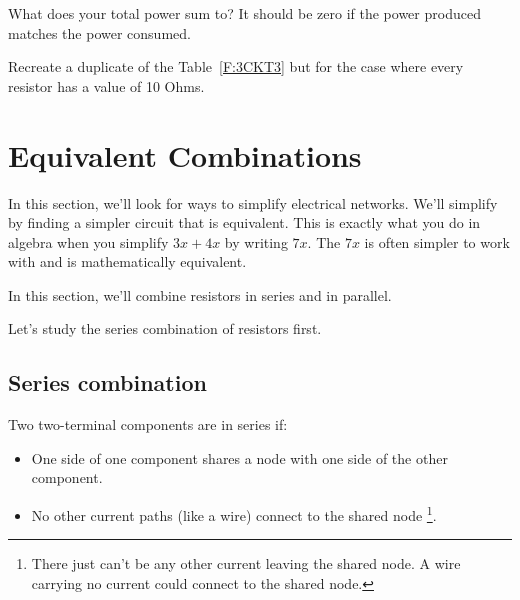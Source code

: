 \begin{clevel}
What does your total power sum to? It should be zero if the power produced matches the power consumed.
\end{clevel}

\begin{clevel}
Recreate a duplicate of the Table~\ref{F:3CKT3} but for the case where every resistor has a value of 10 Ohms.
\end{clevel}

\section{Equivalent Combinations}
In this section, we'll look for ways to simplify electrical networks. We'll simplify by finding a simpler circuit that is equivalent. This is exactly what you do in algebra when you simplify $3x+4x$ by writing $7x$. The $7x$ is often simpler to work with and is mathematically equivalent.\par

\vspace{3 mm}
\vspace{3 mm}

In this section, we'll combine resistors in series and in parallel. 



Let's study the series combination of resistors first. 

\par

\subsection{Series combination}
Two two-terminal components are in series if:
\begin{itemize}
\item One side of one component shares a node with one side of the other component.
\item No other current paths (like a wire) connect to the shared node \footnote{There just can't be any other current leaving the shared node. A wire carrying no current could connect to the shared node.}.
\end{itemize}

